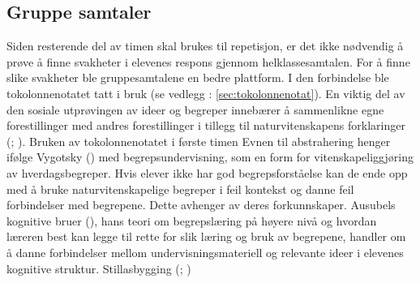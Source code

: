 \documentclass[main.tex]{subfiles}
\begin{document}
\subsection*{Gruppe samtaler}
Siden resterende del av timen skal brukes til repetisjon, er det ikke nødvendig å 
prøve å finne svakheter i elevenes respons gjennom helklassesamtalen. For å finne slike svakheter 
ble gruppesamtalene en bedre plattform. I den forbindelse ble tokolonnenotatet tatt i bruk (se 
vedlegg : \ref{sec:tokolonnenotat}).
\newline
\newline
En viktig del av den sosiale utprøvingen av ideer og begreper innebærer å sammenlikne egne 
forestillinger med andres forestillinger i tillegg til naturvitenskapens forklaringer 
(; ). Bruken av tokolonnenotatet i første timen 
\newline
\newline
Evnen til abstrahering henger ifølge Vygotsky () med begrepsundervisning, som en
form for vitenskapeliggjøring av hverdagsbegreper. Hvis elever ikke har god begrepsforståelse
kan de ende opp med å bruke naturvitenskapelige begreper i feil kontekst og danne feil 
forbindelser med begrepene. Dette avhenger av deres forkunnskaper. Ausubels kognitive bruer 
(), hans teori om begrepslæring på høyere nivå og hvordan læreren best kan 
legge til rette for slik læring og bruk av begrepene,  handler om å danne forbindelser mellom 
undervisningsmateriell og relevante ideer i elevenes kognitive struktur.
\newline
\newline
Stillasbygging (; )

\end{document}
